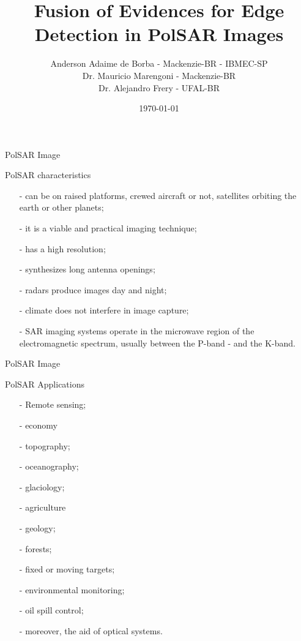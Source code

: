 \documentclass[10pt]{beamer}
\title{Fusion of Evidences for Edge Detection in PolSAR Images}
\date{\today}
\author{Anderson Adaime de Borba - Mackenzie-BR - IBMEC-SP\\
        Dr. Mauricio Marengoni - Mackenzie-BR\\
        Dr. Alejandro Frery - UFAL-BR}
\institute{TENGARSS- 2019}
\begin{document}
\maketitle


\begin{frame}[fragile]{PolSAR Image}
\begin{alertblock}{PolSAR characteristics}
\begin{itemize}
\item[-] can be on raised platforms, crewed aircraft or not, satellites orbiting the  earth or other planets;
\item[-] it is a viable and practical imaging technique;
\item[-] has a high resolution;
\item[-] synthesizes long antenna openings;
\item[-] radars produce images day and night;
\item[-] climate does not interfere in image capture;
\item[-] SAR imaging systems operate in the microwave region of the electromagnetic spectrum, usually between the P-band - and the K-band.
\end{itemize}
\end{alertblock}
\end{frame}

\begin{frame}[fragile]{PolSAR Image}
\begin{alertblock}{PolSAR Applications}
\begin{itemize}
\item[-] Remote sensing;
\item[-] economy
\item[-] topography;
\item[-] oceanography;
\item[-] glaciology;
\item[-] agriculture
\item[-] geology;
\item[-] forests;
\item[-] fixed or moving targets;
\item[-] environmental monitoring;
\item[-] oil spill control;
\item[-] moreover, the aid of optical systems.
\end{itemize}
\end{alertblock}
\end{frame}
\end{document}
